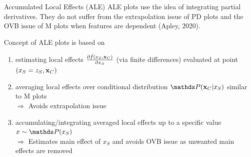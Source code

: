 \documentclass[11pt,compress,t,notes=noshow, aspectratio=169, xcolor=table]{beamer}
\begin{document}
\begin{frame}{Accumulated Local Effects (ALE) }
ALE plots use the idea of integrating partial derivatives. They do not suffer from the extrapolation issue of PD plots and the OVB issue of M plots when features are dependent (Apley, 2020).

\lz
Concept of ALE plots is based on
\begin{enumerate}[<+->]
\item estimating local effects $\frac{\partial \fh(x_S, \xv_C)}{\partial x_S}$ (via finite differences) evaluated at point $(x_S = z_S, \xv_C)$
\item averaging local effects over conditional distribution $\P(\xv_C|x_S)$ similar to M plots\\ %
$\Rightarrow$ Avoids extrapolation issue
\item accumulating/integrating averaged local effects up to a specific value $x \sim \P(x_S)$\\ %
$\Rightarrow$ Estimates main effect of $x_S$ and avoids OVB issue as unwanted main effects are removed
\end{enumerate}

\end{frame}
\end{document}

